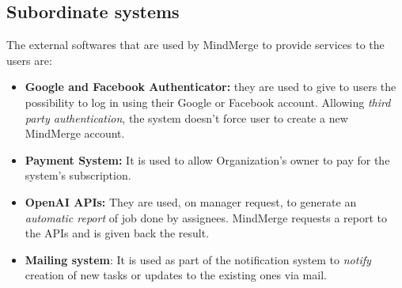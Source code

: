 \documentclass{article}
\begin{document}
\subsection{Subordinate systems}
The external softwares that are used by MindMerge to provide services to the users are:
\begin{itemize}
    \item \textbf{Google and Facebook Authenticator:} they are used to give to users the possibility to log in using their Google or Facebook account. Allowing \textit{third party authentication}, the system doesn't force user to create a new MindMerge account.
    \item \textbf{Payment System:} It is used to allow Organization's owner to pay for the system's subscription.
    \item \textbf{OpenAI APIs:} They are used, on manager request, to generate an \textit{automatic report} of job done by assignees. MindMerge requests a report to the APIs and is given back the result.
    \item \textbf{Mailing system}: It is used as part of the notification system to \textit{notify} creation of new tasks or updates to the existing ones via mail.
\end{itemize}
\end{document}
